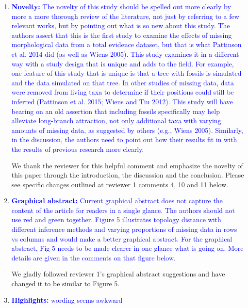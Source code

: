 \documentclass[12pt,letterpaper]{article}
\begin{document}
\begin{enumerate}
\item{\textcolor{blue}{\textbf{Novelty:} The novelty of this study should be spelled out more clearly by more a more thorough review of the literature, not just by referring to a few relevant works, but by pointing out what is so new about this study.
The authors assert that this is the first study to examine the effects of missing morphological data from a total evidence dataset, but that is what Pattinson et al. 2014 did (as well as Wiens 2005).
This study examines it in a different way with a study design that is unique and adds to the field. For example, one feature of this study that is unique is that a tree with fossils is simulated and the data simulated on that tree.
In other studies of missing data, data were removed from living taxa to determine if their positions could still be inferred (Pattinson et al. 2015; Wiens and Tiu 2012).
This study will have bearing on an old assertion that including fossils specifically may help alleviate long-branch attraction, not only additional taxa with varying amounts of missing data, as suggested by others (e.g., Wiens 2005).
Similarly, in the discussion, the authors need to point out how their results fit in with the results of previous research more clearly. }}

We thank the reviewer for this helpful comment and emphasize the novelty of this paper through the introduction, the discussion and the conclusion.
Please see specific changes outlined at reviewer 1 comments 4, 10 and 11 below.


\item{\textcolor{blue}{\textbf{Graphical abstract:} Current graphical abstract does not capture the content of the article for readers in a single glance.
The authors should not use red and green together.
Figure 5 illustrates topology distance with different inference methods and varying proportions of missing data in rows vs columns and would make a better graphical abstract.
For the graphical abstract, Fig 5 needs to be made clearer in one glance what is going on.
More details are given in the comments on that figure below.}}

We gladly followed reviewer 1's graphical abstract suggestions and have changed it to be similar to Figure 5.


\item{\textcolor{blue}{\textbf{Highlights:} wording seems awkward}}


\end{enumerate}
\end{document}
